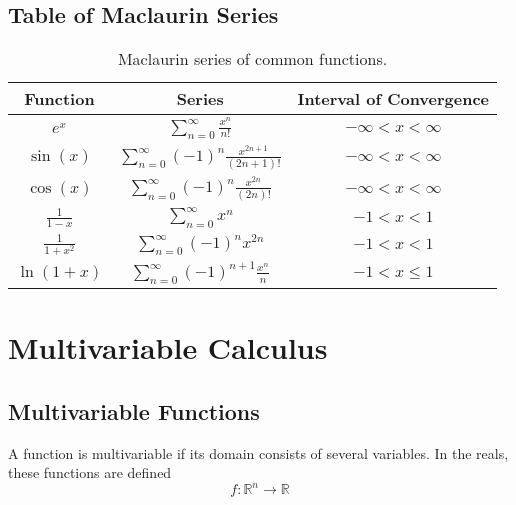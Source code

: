 \documentclass{article}
\begin{document}
\subsection{Table of Maclaurin Series}
\begin{table}[H]
    \centering
    \begin{tabular}{c c c}
        \toprule
        \textbf{Function}                         & \textbf{Series}                                                                                 & \textbf{Interval of Convergence} \\
        \midrule
        \(e^{x}\)                                & \(\displaystyle \sum_{n=0}^{\infty} \frac{x^n}{n!}\)                                            & \(-\infty < x < \infty\)         \\[14pt]
        \(\sin{\left( x \right)}\)                & \(\displaystyle \sum_{n=0}^{\infty} \left( -1 \right)^n \frac{x^{2n+1}}{\left( 2n+1 \right)!}\) & \(-\infty < x < \infty\)         \\[14pt]
        \(\cos{\left( x \right)}\)                & \(\displaystyle \sum_{n=0}^{\infty} \left( -1 \right)^n \frac{x^{2n}}{\left( 2n \right)!}\)     & \(-\infty < x < \infty\)         \\[14pt]
        \(\displaystyle \frac{1}{1-x}\)           & \(\displaystyle \sum_{n=0}^{\infty} x^n\)                                                       & \(-1 < x < 1\)                   \\[14pt]
        \(\displaystyle \frac{1}{1+x^2}\)         & \(\displaystyle \sum_{n=0}^{\infty} \left( -1 \right)^n x^{2n}\)                                & \(-1 < x < 1\)                   \\[14pt]
        \(\displaystyle \ln{\left( 1+x \right)}\) & \(\displaystyle \sum_{n=0}^{\infty} \left( -1 \right)^{n+1} \frac{x^n}{n}\)                     & \(-1 < x \leq 1\)                \\[14pt]
        \bottomrule
    \end{tabular}
    \caption{Maclaurin series of common functions.}
\end{table}
\newpage
\section{Multivariable Calculus}
\subsection{Multivariable Functions}
\begin{definition}
    A function is multivariable if its domain consists of several variables. In
    the reals, these functions are defined
    \begin{equation*}
        f:\mathbb{R}^n\to\mathbb{R}
    \end{equation*}
\end{definition}
\end{document}
